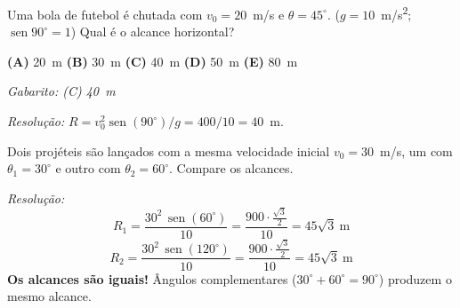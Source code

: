\documentclass[12pt,a4paper]{article}
\begin{document}
\begin{tcolorbox}[enembox={Quest\~ao 7 --- Lan\c{c}amento obl\'iquo}]
  Uma bola de futebol \'e chutada com $v_0 = 20$~m/s e $\theta = 45^\circ$.
  ($g = 10$~m/s\textsuperscript{2};\; $\operatorname{sen}90^\circ = 1$)
  Qual \'e o alcance horizontal?

  \medskip
  \textbf{(A)} 20~m \quad
  \textbf{(B)} 30~m \quad
  \textbf{(C)} 40~m \quad
  \textbf{(D)} 50~m \quad
  \textbf{(E)} 80~m

  \medskip
  \textit{Gabarito: (C) 40~m}

  \textit{Resolu\c{c}\~ao:}
  $R = v_0^2\operatorname{sen}(90^\circ)/g = 400/10 = 40$~m.
\end{tcolorbox}

\begin{tcolorbox}[enembox={Quest\~ao 8 --- Lan\c{c}amento obl\'iquo: \^angulo de alcance m\'aximo}]
  Dois proj\'eteis s\~ao lan\c{c}ados com a mesma velocidade inicial
  $v_0 = 30$~m/s, um com $\theta_1 = 30^\circ$ e outro com $\theta_2 = 60^\circ$.
  Compare os alcances.

  \medskip
  \textit{Resolu\c{c}\~ao:}
  \[
    R_1 = \frac{30^2\,\operatorname{sen}(60^\circ)}{10}
        = \frac{900\cdot\frac{\sqrt{3}}{2}}{10} = 45\sqrt{3}~\text{m}
  \]
  \[
    R_2 = \frac{30^2\,\operatorname{sen}(120^\circ)}{10}
        = \frac{900\cdot\frac{\sqrt{3}}{2}}{10} = 45\sqrt{3}~\text{m}
  \]
  \textbf{Os alcances s\~ao iguais!} \^Angulos complementares
  ($30^\circ + 60^\circ = 90^\circ$) produzem o mesmo alcance.
\end{tcolorbox}
\end{document}
